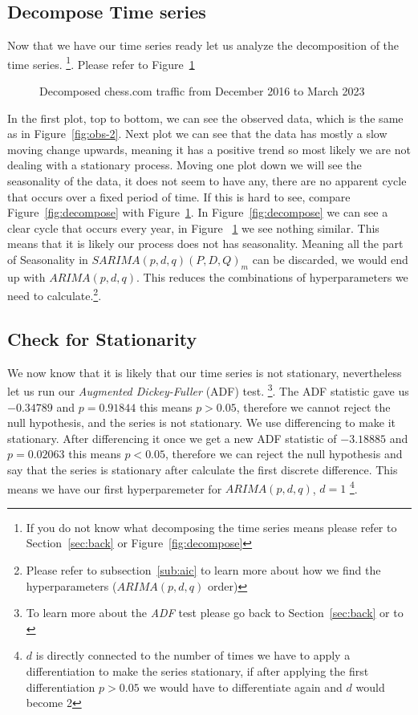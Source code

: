\documentclass[journal]{IEEEtran}
\begin{document}
\subsection{Decompose Time series}\label{sub:decompose-time-series}

Now that we have our time series ready let us analyze the decomposition of the
time series. \footnote{If you do not know what decomposing the time series
means please refer to Section~\ref{sec:back} or Figure~\ref{fig:decompose}}.
Please refer to Figure~\ref{fig:decom-chess}

\begin{figure}[htbp]
  \centering
  
    \caption{Decomposed chess.com traffic from December 2016 to March 2023}
    \label{fig:decom-chess}
\end{figure}

In the first plot, top to bottom, we can see the observed data, which is the
same as in Figure~\ref{fig:obs-2}. Next plot we can see that the data has
mostly a slow moving change upwards, meaning it has a positive trend so most
likely we are not dealing with a stationary process. Moving one plot down we
will see the seasonality of the data, it does not seem to have any, there are
no apparent cycle that occurs over a fixed period of time.  If this is hard to
see, compare Figure~\ref{fig:decompose} with Figure~\ref{fig:decom-chess}. In
Figure~\ref{fig:decompose} we can see a clear cycle that occurs every year, in
Figure ~\ref{fig:decom-chess} we see nothing similar. This means that it is
likely our process does not has seasonality. Meaning all the part of
Seasonality in $SARIMA(p,d,q)(P,D,Q)_m$ can be discarded, we would end up with
$ARIMA(p,d,q)$. This reduces the combinations of hyperparameters we need to
calculate.\footnote{Please refer to subsection~\ref{sub:aic} to learn more
about how we find the hyperparameters ($ARIMA(p,d,q)$ order)}.

\subsection{Check for Stationarity}

We now know that it is likely that our time series is not stationary,
nevertheless let us run our \emph{Augmented Dickey-Fuller} (ADF) test.
\footnote{To learn more about the \emph{ADF} test please go back to
Section~\ref{sec:back} or to \cite{adf}}. The ADF statistic gave us $-0.34789$
and $p = 0.91844$ this means $p > 0.05$, therefore we cannot reject the null
hypothesis, and the series is not stationary. We use differencing to make it
stationary. After differencing it once we get a new ADF statistic of
$-3.18885$ and $p = 0.02063$ this means $p < 0.05$, therefore we can reject
the null hypothesis and say that the series is stationary after calculate the
first discrete difference. This means we have our first hyperparemeter for
$ARIMA(p,d,q)$, $d = 1$ \footnote{$d$ is directly connected to the number of
times we have to apply a differentiation to make the series stationary, if
after applying the first differentiation $p > 0.05$ we would have to
differentiate again and $d$ would become 2}.
\end{document}
